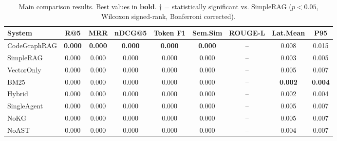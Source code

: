 \begin{table}[t]
\centering
\caption{Main comparison results. Best values in \textbf{bold}. 
$\dagger$ = statistically significant vs. SimpleRAG ($p < 0.05$, Wilcoxon signed-rank, Bonferroni corrected).}
\begin{tabular}{lcccccccc}
\toprule
System & R@5 & MRR & nDCG@5 & Token F1 & Sem.Sim & ROUGE-L & Lat.Mean & P95 \\
\midrule
CodeGraphRAG & \textbf{0.000} & \textbf{0.000} & \textbf{0.000} & \textbf{0.000} & \textbf{0.000} & -- & 0.008 & 0.015 \\
SimpleRAG & 0.000 & 0.000 & 0.000 & 0.000 & 0.000 & -- & 0.003 & 0.005 \\
VectorOnly & 0.000 & 0.000 & 0.000 & 0.000 & 0.000 & -- & 0.005 & 0.007 \\
BM25 & 0.000 & 0.000 & 0.000 & 0.000 & 0.000 & -- & \textbf{0.002} & \textbf{0.004} \\
Hybrid & 0.000 & 0.000 & 0.000 & 0.000 & 0.000 & -- & 0.002 & 0.004 \\
SingleAgent & 0.000 & 0.000 & 0.000 & 0.000 & 0.000 & -- & 0.005 & 0.007 \\
NoKG & 0.000 & 0.000 & 0.000 & 0.000 & 0.000 & -- & 0.005 & 0.007 \\
NoAST & 0.000 & 0.000 & 0.000 & 0.000 & 0.000 & -- & 0.004 & 0.007 \\
\bottomrule
\end{tabular}
\end{table}